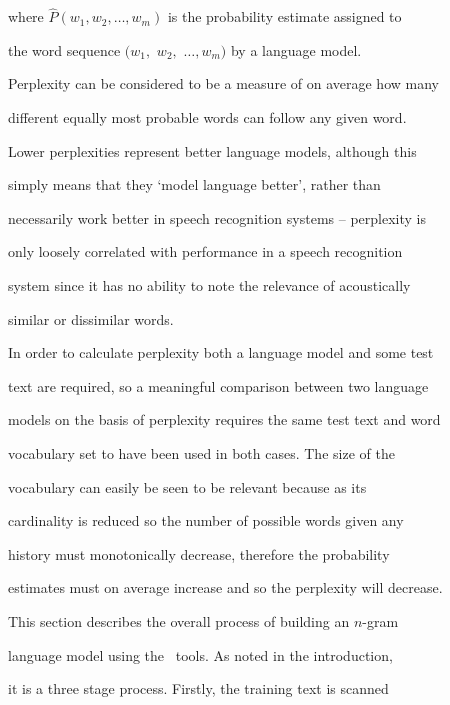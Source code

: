 where $\hat{P}(w_1, w_2, \ldots, w_m)$ is the probability estimate assigned to


the word sequence $(w_1,$ $w_2,$ $\ldots, w_m)$ by a language model.





Perplexity can be considered to be a measure of on average how many


different equally most probable words can follow any given word.


Lower perplexities represent better language models, although this


simply means that they `model language better', rather than


necessarily work better in speech recognition systems -- perplexity is


only loosely correlated with performance in a speech recognition


system since it has no ability to note the relevance of acoustically


similar or dissimilar words.





In order to calculate perplexity both a language model and some test


text are required, so a meaningful comparison between two language


models on the basis of perplexity requires the same test text and word


vocabulary set to have been used in both cases. The size of the


vocabulary can easily be seen to be relevant because as its


cardinality is reduced so the number of possible words given any


history must monotonically decrease, therefore the probability


estimates must on average increase and so the perplexity will decrease.










This section describes the overall process of building an $n$-gram


language model using the \HTK\ tools.  As noted in the introduction,


it is a three stage process.  Firstly, the training text is scanned


